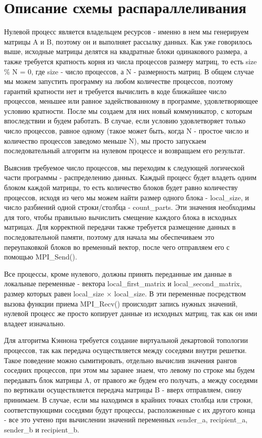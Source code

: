 \documentclass{report}
\begin{document}
\section*{Описание схемы распараллеливания}
\par Нулевой процесс является владельцем ресурсов - именно в нем мы генерируем матрицы A и B, поэтому он и выполняет рассылку данных. Как уже говорилось выше, исходные матрицы делятся на квадратные блоки одинакового размера, а также требуется кратность корня из числа процессов размеру матриц, то есть size \% N = 0, где size - число процессов, а N - размерность матриц. В общем случае мы можем запустить программу на любом количестве процессов, поэтому гарантий кратности нет и требуется вычислить в коде ближайшее число процессов, меньшее или равное задействованному в программе, удовлетворяющее условию кратности. После мы создаем для них новый коммуникатор, с которым впоследствии и будем работать. В случае, если условию удовлетворяет только число процессов, равное одному (такое может быть, когда N - простое число и количество процессов заведомо меньше N), мы просто запускаем последовательный алгоритм на нулевом процессе и возвращаем его результат.
\par Выяснив требуемое число процессов, мы переходим к следующей логической части программы - распределению данных. Каждый процесс будет владеть одним блоком каждой матрицы, то есть количество блоков будет равно количеству процессов, исходя из чего мы можем найти размер одного блока - local\_size, и число разбиений одной строки/столбца - count\_parts. Эти значения необходимы для того, чтобы правильно вычислить смещение каждого блока в исходных матрицах. Для корректной передачи также требуется размещение данных в последовательной памяти, поэтому для начала мы обеспечиваем это переупаковкой блоков во временный вектор, после чего отправляем его с помощью MPI\_Send().
\par Все процессы, кроме нулевого, должны принять переданные им данные в локальные переменные - вектора local\_first\_matrix и local\_second\_matrix, размер которых равен local\_size $ \times $ local\_size. В эти переменные посредством вызова функции приема MPI\_Recv() происходит запись нужных значений, нулевой процесс же просто копирует данные из исходных матриц, так как он ими владеет изначально.
\par Для алгоритма Кэннона требуется создание виртуальной декартовой топологии процессов, так как передача осуществляется между соседями внутри решетки. Такое поведение можно сымитировать, отдельно вычислив значения рангов соседних процессов, при этом мы заранее знаем, что левому по строке мы будем передавать блок матрицы A, от правого же будем его получать, а между соседями по вертикали осуществляется передача матрицы B - вверх отправляем, снизу принимаем. В случае, если мы находимся в крайних точках столбца или строки, соответствующими соседями будут процессы, расположенные с их другого конца - все это учтено при вычислении значений переменных sender\_a, recipient\_a, sender\_b и recipient\_b. 
\end{document}
